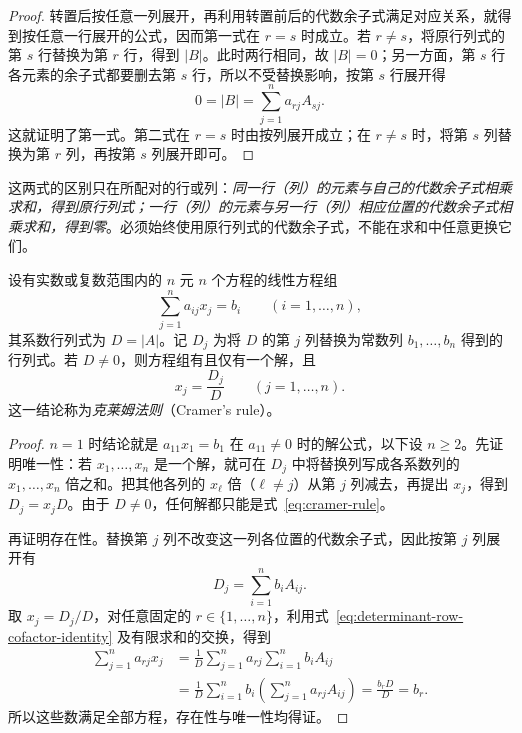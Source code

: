 \begin{proof}
转置后按任意一列展开，再利用转置前后的代数余子式满足对应关系，就得到按任意一行展开的公式，因而第一式在 $r=s$ 时成立。若 $r\ne s$，将原行列式的第 $s$ 行替换为第 $r$ 行，得到 $|B|$。此时两行相同，故 $|B|=0$；另一方面，第 $s$ 行各元素的余子式都要删去第 $s$ 行，所以不受替换影响，按第 $s$ 行展开得
\[
    0=|B|=\sum_{j=1}^{n}a_{rj}A_{sj}.
\]
这就证明了第一式。第二式在 $r=s$ 时由按列展开成立；在 $r\ne s$ 时，将第 $s$ 列替换为第 $r$ 列，再按第 $s$ 列展开即可。
\end{proof}

这两式的区别只在所配对的行或列：\emph{同一行（列）的元素与自己的代数余子式相乘求和，得到原行列式；一行（列）的元素与另一行（列）相应位置的代数余子式相乘求和，得到零}。必须始终使用原行列式的代数余子式，不能在求和中任意更换它们。

\begin{theorem}[Cramer 法则]
\label{thm:cramer-rule}
设有实数或复数范围内的 $n$ 元 $n$ 个方程的线性方程组
\[
    \sum_{j=1}^{n}a_{ij}x_j=b_i\qquad(i=1,\ldots,n),
\]
其系数行列式为 $D=|A|$。记 $D_j$ 为将 $D$ 的第 $j$ 列替换为常数列 $b_1,\ldots,b_n$ 得到的行列式。若 $D\ne0$，则方程组有且仅有一个解，且
\begin{equation}
\label{eq:cramer-rule}
    x_j=\frac{D_j}{D}\qquad(j=1,\ldots,n).
\end{equation}
这一结论称为\emph{克莱姆法则}（Cramer's rule）。
\end{theorem}

\begin{proof}
$n=1$ 时结论就是 $a_{11}x_1=b_1$ 在 $a_{11}\ne0$ 时的解公式，以下设 $n\geq2$。先证明唯一性：若 $x_1,\ldots,x_n$ 是一个解，就可在 $D_j$ 中将替换列写成各系数列的 $x_1,\ldots,x_n$ 倍之和。把其他各列的 $x_\ell$ 倍（$\ell\ne j$）从第 $j$ 列减去，再提出 $x_j$，得到 $D_j=x_jD$。由于 $D\ne0$，任何解都只能是式~\eqref{eq:cramer-rule}。

再证明存在性。替换第 $j$ 列不改变这一列各位置的代数余子式，因此按第 $j$ 列展开有
\[
    D_j=\sum_{i=1}^{n}b_iA_{ij}.
\]
取 $x_j=D_j/D$，对任意固定的 $r\in\{1,\ldots,n\}$，利用式~\eqref{eq:determinant-row-cofactor-identity} 及有限求和的交换，得到
\[
    \begin{aligned}
    \sum_{j=1}^{n}a_{rj}x_j
      &=\frac{1}{D}\sum_{j=1}^{n}a_{rj}\sum_{i=1}^{n}b_iA_{ij}\\
      &=\frac{1}{D}\sum_{i=1}^{n}b_i
          \left(\sum_{j=1}^{n}a_{rj}A_{ij}\right)
       =\frac{b_rD}{D}=b_r.
    \end{aligned}
\]
所以这些数满足全部方程，存在性与唯一性均得证。
\end{proof}


